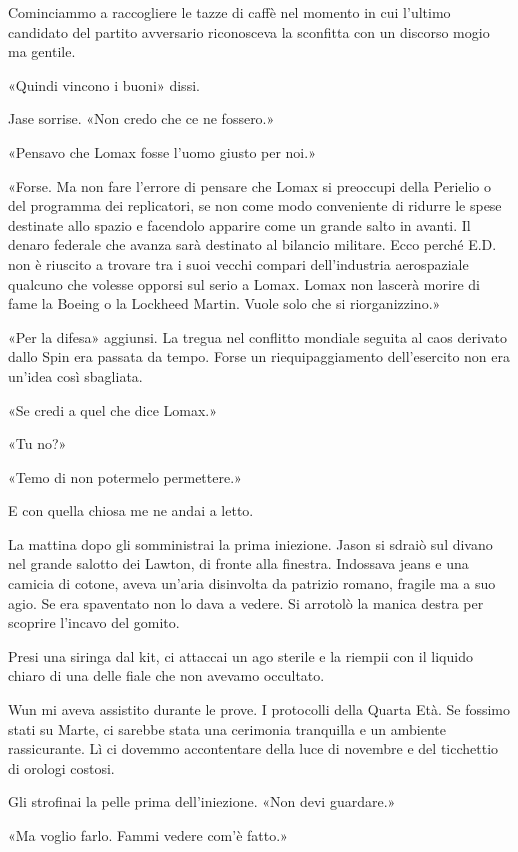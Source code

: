 Cominciammo a raccogliere le tazze di caffè nel momento in cui l'ultimo
candidato del partito avversario riconosceva la sconfitta con un
discorso mogio ma gentile.

«Quindi vincono i buoni» dissi.

Jase sorrise. «Non credo che ce ne fossero.»

«Pensavo che Lomax fosse l'uomo giusto per noi.»

«Forse. Ma non fare l'errore di pensare che Lomax si preoccupi della
Perielio o del programma dei replicatori, se non come modo conveniente
di ridurre le spese destinate allo spazio e facendolo apparire come un
grande salto in avanti. Il denaro federale che avanza sarà destinato al
bilancio militare. Ecco perché E.D. non è riuscito a trovare tra i suoi
vecchi compari dell'industria aerospaziale qualcuno che volesse opporsi
sul serio a Lomax. Lomax non lascerà morire di fame la Boeing o la
Lockheed Martin. Vuole solo che si riorganizzino.»

«Per la difesa» aggiunsi. La tregua nel conflitto mondiale seguita al
caos derivato dallo Spin era passata da tempo. Forse un
riequipaggiamento dell'esercito non era un'idea così sbagliata.

«Se credi a quel che dice Lomax.»

«Tu no?»

«Temo di non potermelo permettere.»

E con quella chiosa me ne andai a letto.

La mattina dopo gli somministrai la prima iniezione. Jason si sdraiò sul
divano nel grande salotto dei Lawton, di fronte alla finestra. Indossava
jeans e una camicia di cotone, aveva un'aria disinvolta da patrizio
romano, fragile ma a suo agio. Se era spaventato non lo dava a vedere.
Si arrotolò la manica destra per scoprire l'incavo del gomito.

Presi una siringa dal kit, ci attaccai un ago sterile e la riempii con
il liquido chiaro di una delle fiale che non avevamo occultato.

Wun mi aveva assistito durante le prove. I protocolli della Quarta Età.
Se fossimo stati su Marte, ci sarebbe stata una cerimonia tranquilla e
un ambiente rassicurante. Lì ci dovemmo accontentare della luce di
novembre e del ticchettio di orologi costosi.

Gli strofinai la pelle prima dell'iniezione. «Non devi guardare.»

«Ma voglio farlo. Fammi vedere com'è fatto.»

